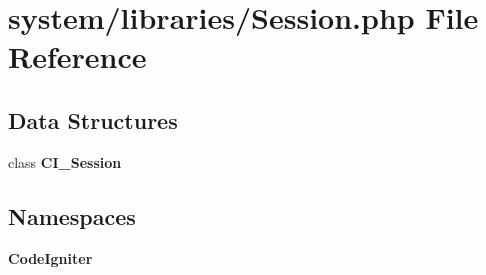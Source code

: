 \section{system/libraries/\-Session.php File Reference}
\label{_session_8php}
\subsection*{Data Structures}
\begin{DoxyCompactItemize}
\item 
class {\bf C\-I\-\_\-\-Session}
\end{DoxyCompactItemize}
\subsection*{Namespaces}
\begin{DoxyCompactItemize}
\item 
{\bf Code\-Igniter}
\end{DoxyCompactItemize}
